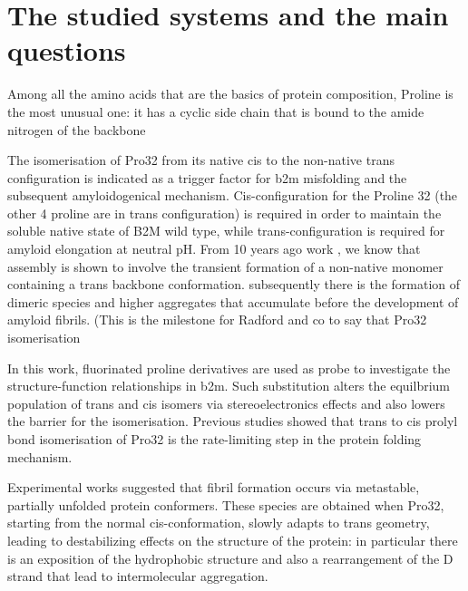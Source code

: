

\section{The studied systems and the main questions}
Among all the amino acids that are the basics of protein composition, Proline is the most unusual one: it has a cyclic side chain that is bound to the amide nitrogen of the backbone  

\cite{Eichner_2009}
The isomerisation of Pro32 from its native cis to the non-native trans configuration is indicated as a trigger factor for b2m misfolding and the subsequent amyloidogenical mechanism.
Cis-configuration for the Proline 32 (the other 4 proline are in trans configuration) is required in order to maintain the soluble native state of B2M wild type, while trans-configuration is required for amyloid elongation at neutral pH. From 10 years ago work \cite{Eichner_2009} , we know that assembly is shown to involve the transient formation of a non-native monomer containing a trans backbone conformation. subsequently there is the formation of dimeric species and higher aggregates that accumulate before the development of amyloid fibrils. (This is the milestone for Radford and co to say that Pro32 isomerisation

In this work, fluorinated proline derivatives are used as probe to investigate the structure-function relationships in b2m. Such substitution alters the equilbrium population of trans and cis isomers via stereoelectronics effects and also lowers the barrier for the isomerisation.
Previous studies showed that trans to cis prolyl bond isomerisation of Pro32 is the rate-limiting step in the protein folding mechanism.

Experimental works suggested that fibril formation occurs via metastable, partially unfolded protein conformers. These species are obtained when Pro32, starting from the normal cis-conformation, slowly adapts to trans geometry, leading to destabilizing effects on the structure of the protein: in particular there is an exposition of the hydrophobic structure and also a rearrangement of the D strand that lead to intermolecular aggregation. 